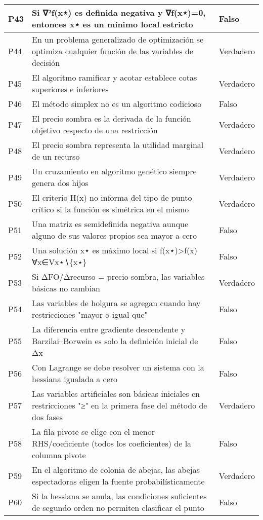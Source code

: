 \documentclass{article}
\begin{document}
\begin{longtable}{|>{\centering\arraybackslash}p{1.5cm}|>{\raggedright\arraybackslash}p{14cm}|>{\centering\arraybackslash}p{2cm}|}
\hline
P43 & Si ∇²f(x⋆) es definida negativa y ∇f(x⋆)=0, entonces x⋆ es un mínimo local estricto & Falso \\
\hline
P44 & En un problema generalizado de optimización se optimiza cualquier función de las variables de decisión & Verdadero \\
\hline
P45 & El algoritmo ramificar y acotar establece cotas superiores e inferiores & Verdadero \\
\hline
P46 & El método simplex no es un algoritmo codicioso & Falso \\
\hline
P47 & El precio sombra es la derivada de la función objetivo respecto de una restricción & Verdadero \\
\hline
P48 & El precio sombra representa la utilidad marginal de un recurso & Verdadero \\
\hline
P49 & Un cruzamiento en algoritmo genético siempre genera dos hijos & Verdadero \\
\hline
P50 & El criterio H(x) no informa del tipo de punto crítico si la función es simétrica en el mismo & Verdadero \\
\hline
P51 & Una matriz es semidefinida negativa aunque alguno de sus valores propios sea mayor a cero & Falso \\
\hline
P52 & Una solución x⋆ es máximo local si f(x⋆)>f(x) ∀x∈Vx⋆∖\{x⋆\} & Falso \\
\hline
P53 & Si ΔFO/Δrecurso = precio sombra, las variables básicas no cambian & Verdadero \\
\hline
P54 & Las variables de holgura se agregan cuando hay restricciones "mayor o igual que" & Falso \\
\hline
P55 & La diferencia entre gradiente descendente y Barzilai–Borwein es solo la definición inicial de Δx & Falso \\
\hline
P56 & Con Lagrange se debe resolver un sistema con la hessiana igualada a cero & Falso \\
\hline
P57 & Las variables artificiales son básicas iniciales en restricciones "≥" en la primera fase del método de dos fases & Verdadero \\
\hline
P58 & La fila pivote se elige con el menor RHS/coeficiente (todos los coeficientes) de la columna pivote & Falso \\
\hline
P59 & En el algoritmo de colonia de abejas, las abejas espectadoras eligen la fuente probabilísticamente & Verdadero \\
\hline
P60 & Si la hessiana se anula, las condiciones suficientes de segundo orden no permiten clasificar el punto & Falso \\

\end{longtable}
\end{document}
